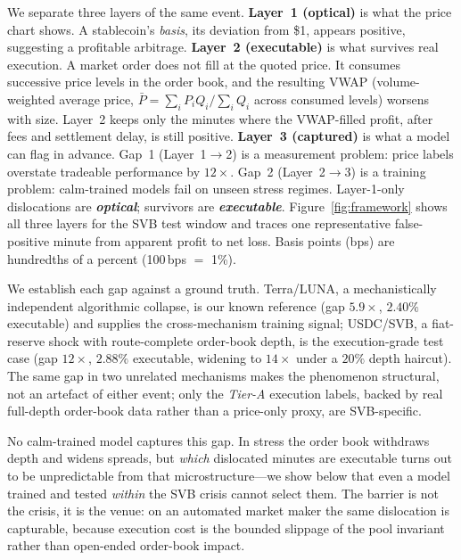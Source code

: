 \documentclass[sigconf,anonymous,natbib=false]{acmart}
\begin{document}
We separate three layers of the same event.
\textbf{Layer~1 (optical)} is what the price chart shows. A stablecoin's
\emph{basis}, its deviation from \$1, appears positive, suggesting a
profitable arbitrage.
\textbf{Layer~2 (executable)} is what survives real execution.  A market
order does not fill at the quoted price. It consumes successive price
levels in the order book, and the resulting VWAP (volume-weighted average
price, $\bar{P}=\sum_i P_i Q_i / \sum_i Q_i$ across consumed levels)
worsens with size.  Layer~2 keeps only the minutes where the VWAP-filled
profit, after fees and settlement delay, is still positive.
\textbf{Layer~3 (captured)} is what a model can flag in advance.
Gap~1 (Layer~1$\to$2) is a measurement problem: price labels overstate
tradeable performance by $12\times$. Gap~2 (Layer~2$\to$3) is a training
problem: calm-trained models fail on unseen stress regimes. Layer-1-only
dislocations are \textbf{\emph{optical}}; survivors are \textbf{\emph{executable}}.
Figure~\ref{fig:framework} shows all three layers for the SVB test
window and traces one representative false-positive minute from
apparent profit to net loss.
Basis points (bps) are hundredths of a percent (100\,bps $=$ 1\%).

We establish each gap against a ground truth. Terra/LUNA, a mechanistically
independent algorithmic collapse, is our known reference (gap $5.9\times$,
$2.40\%$ executable) and supplies the cross-mechanism training signal; USDC/SVB,
a fiat-reserve shock with route-complete order-book depth, is the execution-grade
test case (gap $12\times$, $2.88\%$ executable, widening to $14\times$ under a
$20\%$ depth haircut). The same gap in two unrelated mechanisms makes the
phenomenon structural, not an artefact of either event; only the \emph{Tier-A}
execution labels, backed by real full-depth order-book data rather than a
price-only proxy, are SVB-specific.

No calm-trained model captures this gap. In stress the order book withdraws depth and
widens spreads, but \emph{which} dislocated minutes are executable turns out to be
unpredictable from that microstructure---we show below that even a model trained and
tested \emph{within} the SVB crisis cannot select them. The barrier is not the crisis,
it is the venue: on an automated market maker the same dislocation is capturable, because
execution cost is the bounded slippage of the pool invariant rather than open-ended
order-book impact.
\end{document}
